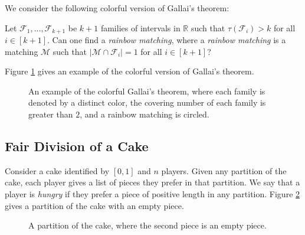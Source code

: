 \documentclass[letterpaper, reqno,12pt]{article}
\newcommand{\RR}{\mathbb{R}}
\begin{document}
We consider the following colorful version of Gallai's theorem:

\begin{problem}
  Let $\mathcal F_1, \ldots, \mathcal F_{k + 1}$ be $k + 1$ families of intervals in $\RR$ such that $\tau(\mathcal F_i) > k$ for all $i \in [k + 1]$. Can one find a \emph{rainbow matching}, where a \emph{rainbow matching} is a matching $\mathcal M$ such that $|\mathcal M \cap \mathcal F_i| = 1$ for all $i \in [k + 1]$?
\end{problem}

Figure \ref{fig:colorful-gallai} gives an example of the colorful version of Gallai's theorem.

\begin{figure}[h]
  \centering
  \caption{An example of the colorful Gallai's theorem, where each family is denoted by a distinct color, the covering number of each family is greater than $2$, and a rainbow matching is circled.}
  \label{fig:colorful-gallai}
\end{figure}

\subsection{Fair Division of a Cake}

Consider a cake identified by $[0, 1]$ and $n$ players. Given any partition of the cake, each player gives a list of pieces they prefer in that partition. We say that a player is \emph{hungry} if they prefer a piece of positive length in any partition. Figure \ref{fig:empty} gives a partition of the cake with an empty piece.

\begin{figure}[h]
  \centering
  \caption{A partition of the cake, where the second piece is an empty piece.}
  \label{fig:empty}
\end{figure}
\end{document}
